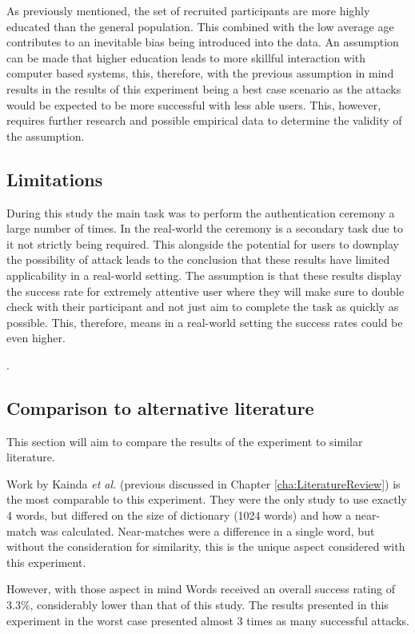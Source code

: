 As previously mentioned, the set of recruited participants are more highly educated than the general population. This combined with the low average age contributes to an inevitable bias being introduced into the data. An assumption can be made that higher education leads to more skillful interaction with computer based systems, this, therefore, with the previous assumption in mind results in the results of this experiment being a best case scenario as the attacks would be expected to be more successful with less able users. This, however, requires further research and possible empirical data to determine the validity of the assumption. 

\subsection*{Limitations}
During this study the main task was to perform the authentication ceremony a large number of times. In the real-world the ceremony is a secondary task due to it not strictly being required. This alongside the potential for users to downplay the possibility of attack leads to the conclusion that these results have limited applicability in a real-world setting. The assumption is that these results display the success rate for extremely attentive user where they will make sure to double check with their participant and not just aim to complete the task as quickly as possible. This, therefore, means in a real-world setting the success rates could be even higher.

.

\subsection{Comparison to alternative literature}
This section will aim to compare the results of the experiment to similar literature.

Work by Kainda \textit{et al.}\cite{kainda2009usability} (previous discussed in Chapter \ref{cha:LiteratureReview}) is the most comparable to this experiment. They were the only study to use exactly 4 words, but differed on the size of dictionary (1024 words) and how a near-match was calculated. Near-matches were a difference in a single word, but without the consideration for similarity, this is the unique aspect considered with this experiment.

However, with those aspect in mind Words received an overall success rating of 3.3\%, considerably lower than that of this study. The results presented in this experiment in the worst case presented almost 3 times as many successful attacks.

